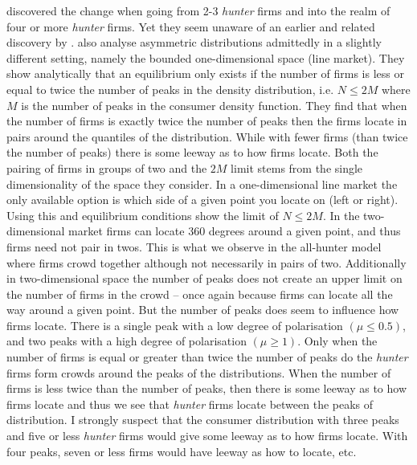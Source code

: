 \documentclass[preprint, 12pt]{elsarticle}
\begin{document}
\citet[chapter~5]{Laver_Sergenti_2011} discovered the change when going from 2-3 \emph{hunter} firms and into the realm of four or more \emph{hunter} firms. Yet they seem unaware of an earlier and related discovery by \citet{Eaton_Lipsey_1975}. \citet{Eaton_Lipsey_1975} also analyse asymmetric distributions admittedly in a slightly different setting, namely the bounded one-dimensional space (line market). They show analytically that an equilibrium only exists if the number of firms is less or equal to twice the number of peaks in the density distribution, i.e. $N \le 2M$ where $M$ is the number of peaks in the consumer density function. They find that when the number of firms is exactly twice the number of peaks then the firms locate in pairs around the quantiles of the distribution. While with fewer firms (than twice the number of peaks) there is some leeway as to how firms locate. Both the pairing of firms in groups of two and the $2M$ limit stems from the single dimensionality of the space they consider. In a one-dimensional line market the only available option is which side of a given point you locate on (left or right). Using this and equilibrium conditions \citet{Eaton_Lipsey_1975} show the limit of $N \le 2M$. In the two-dimensional market firms can locate 360 degrees around a given point, and thus firms need not pair in twos. This is what we observe in the all-hunter model where firms crowd together although not necessarily in pairs of two. Additionally in two-dimensional space the number of peaks does not create an upper limit on the number of firms in the crowd -- once again because firms can locate all the way around a given point. But the number of peaks does seem to influence how firms locate. There is a single peak with a low degree of polarisation $(\mu \le 0.5)$, and two peaks with a high degree of polarisation $(\mu \ge 1)$. Only when the number of firms is equal or greater than twice the number of peaks do the \emph{hunter} firms form crowds around the peaks of the distributions. When the number of firms is less twice than the number of peaks, then there is some leeway as to how firms locate and thus we see that \emph{hunter} firms locate between the peaks of distribution. I strongly suspect that the consumer distribution with three peaks and five or less \emph{hunter} firms would give some leeway as to how firms locate. With four peaks, seven or less firms would have leeway as how to locate, etc.
\end{document}
